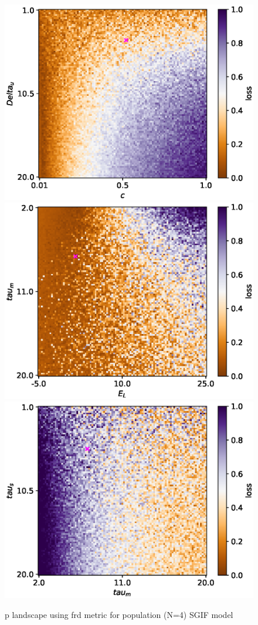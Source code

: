 \documentclass[mphil,deptreport,ianc]{infthesis} %
\begin{document}
\begin{figure}
    \centering
    \vskip -0.1in
    \includegraphics[width=0.32\columnwidth]{figures/param_landscape_heatmaps/microGIF/test_export_2d_heatmap_N_4_loss_c_Delta_u.eps}
    \includegraphics[width=0.32\columnwidth]{figures/param_landscape_heatmaps/microGIF/test_export_2d_heatmap_N_4_loss_E_L_tau_m.eps}
    \includegraphics[width=0.32\columnwidth]{figures/param_landscape_heatmaps/microGIF/test_export_2d_heatmap_N_4_loss_tau_m_tau_s.eps}
    \vskip -0.1in
    \caption{p landscape using frd metric for population (N=4) SGIF model}
    \label{fig:p_landscape_hmap_SGIF}
\end{figure}


\end{document}
